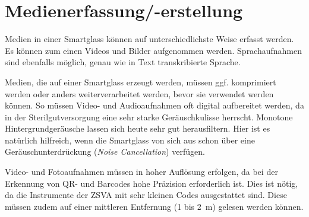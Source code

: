 \section{Medienerfassung/-erstellung}
\label{sec:Medienerfassung_-erstellung}
Medien in einer Smartglass können auf unterschiedlichste Weise erfasst werden. Es können zum einen Videos und Bilder aufgenommen werden. Sprachaufnahmen sind ebenfalls möglich, genau wie in Text transkribierte Sprache.

Medien, die auf einer Smartglass erzeugt werden, müssen ggf. komprimiert werden oder anders weiterverarbeitet werden, bevor sie verwendet werden können. So müssen Video- und Audioaufnahmen oft digital aufbereitet werden, da in der Sterilgutversorgung eine sehr starke Geräuschkulisse herrscht. Monotone Hintergrundgeräusche lassen sich heute sehr gut herausfiltern. Hier ist es natürlich hilfreich, wenn die Smartglass von sich aus schon über eine Geräuschunterdrückung (\emph{Noise Cancellation}) verfügen.

Video- und Fotoaufnahmen müssen in hoher Auflösung erfolgen, da bei der Erkennung von QR- und Barcodes hohe Präzision erforderlich ist. Dies ist nötig, da die Instrumente der ZSVA mit sehr kleinen Codes ausgestattet sind. Diese müssen zudem auf einer mittleren Entfernung (1 bis 2~m) gelesen werden können.
%
